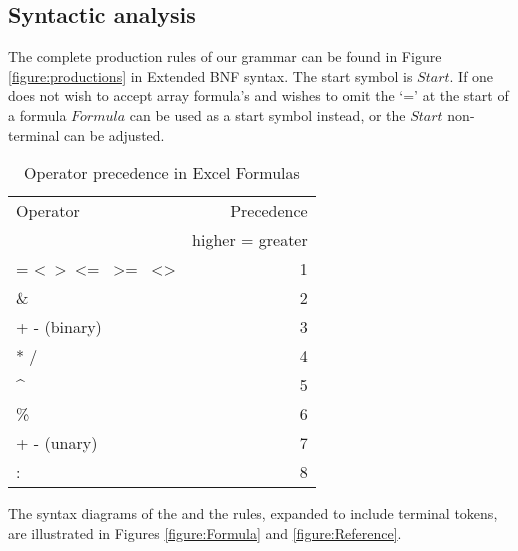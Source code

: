 \documentclass[conference]{IEEEtran}
\begin{document}
\subsection{Syntactic analysis}
\label{subsection:productionRules}

The complete production rules of our grammar can be found in Figure \ref{figure:productions} in Extended BNF syntax. The start symbol is $Start$. If one does not wish to accept array formula's and wishes to omit the `=' at the start of a formula $Formula$ can be used as a start symbol instead, or the $Start$ non-terminal can be adjusted.

\begin{table}
\label{table:operatorprec}
\caption{Operator precedence in Excel Formulas}
\begin{tabular}{lr}
Operator                                                                & Precedence \\
 & higher = greater \\
= \textless \  \textgreater \  \textless= \  \textgreater= \  \textless\textgreater & 1          \\
\&                                                                      & 2          \\
+ - (binary)                                                            & 3          \\
* /                                                                     & 4          \\
\textasciicircum                                                        & 5          \\
\%                                                                      & 6          \\
+ - (unary)                                                             & 7          \\
: \texttt{\char32}                                                             & 8         
\end{tabular}
\end{table}

The syntax diagrams of the  and the  rules, expanded to include terminal tokens, are illustrated in Figures \ref{figure:Formula} and \ref{figure:Reference}.
\end{document}
